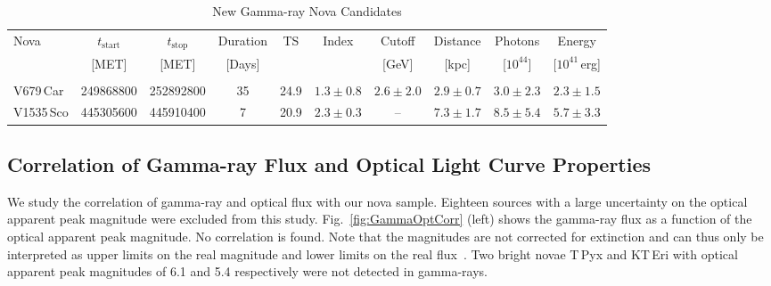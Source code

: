 \documentclass{aa} %
\begin{document}
\begin{table*}
\caption{New Gamma-ray Nova Candidates}
\label{tab:newNovae}
\centering
\begin{tabular}{lccccccccc}
\hline\hline
Nova                &  $t_{\textrm{start}}$ &  $t_{\textrm{stop}}$ & Duration  & TS   &  Index               & Cutoff               & Distance            &  Photons           & Energy\\
                        & [MET]                       & [MET]                      & [Days]     &         &                          & [GeV]               & [kpc]                  & [$10^{44}$]       & [$10^{41}$\,erg]\\
\hline\\
V679\,Car	       &  249868800              & 252892800             & 35           &  24.9 &   $1.3\pm0.8$  &   $2.6\pm2.0$   & $ 2.9 \pm 0.7$  &  $3.0\pm2.3$    & $2.3 \pm 1.5$ \\
V1535\,Sco	& 445305600              & 445910400             & 7             & 20.9  &   $2.3\pm0.3$  & -- &  $ 7.3 \pm 1.7$ &    $8.5\pm5.4$  & $5.7 \pm 3.3$ \\   
\hline
\end{tabular}
\end{table*}




\subsection{Correlation of Gamma-ray Flux and Optical Light Curve Properties}
We study the correlation of gamma-ray and optical flux with our nova sample. Eighteen sources with a large uncertainty on the optical apparent peak magnitude were excluded from this study. Fig.~\ref{fig:GammaOptCorr} (left) shows the gamma-ray flux as a function of the optical apparent peak magnitude. No correlation is found. Note that the magnitudes are not corrected for extinction and can thus only be interpreted as upper limits on the real magnitude and lower limits on the real flux~\citep{2015MNRAS.450.2739M}. Two bright novae T\,Pyx and KT\,Eri with optical apparent peak magnitudes of 6.1 and 5.4 respectively were not detected in gamma-rays. 
\end{document}
